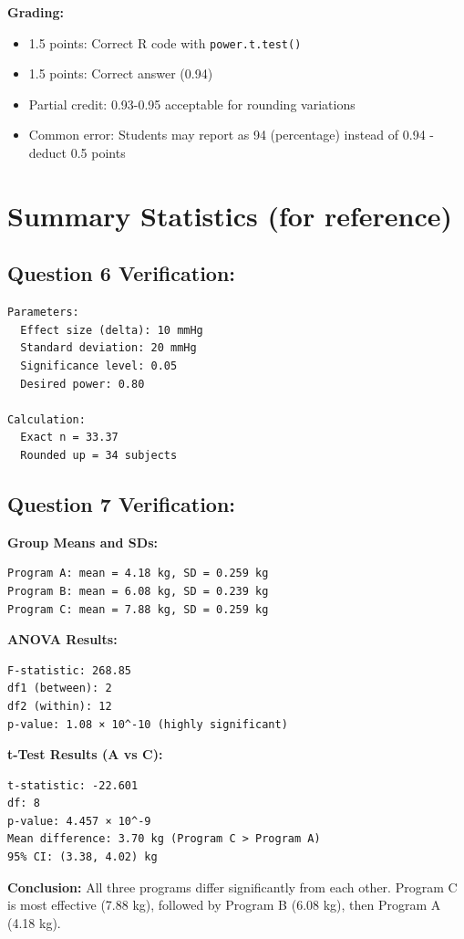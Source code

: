 \documentclass[11pt]{article}
\begin{document}
\textbf{Grading:}
\begin{itemize}
\item 1.5 points: Correct R code with \texttt{power.t.test()}
\item 1.5 points: Correct answer (0.94)
\item Partial credit: 0.93-0.95 acceptable for rounding variations
\item Common error: Students may report as 94 (percentage) instead of 0.94 - deduct 0.5 points
\end{itemize}

\newpage

\section*{Summary Statistics (for reference)}

\subsection*{Question 6 Verification:}
\begin{verbatim}
Parameters:
  Effect size (delta): 10 mmHg
  Standard deviation: 20 mmHg
  Significance level: 0.05
  Desired power: 0.80

Calculation:
  Exact n = 33.37
  Rounded up = 34 subjects
\end{verbatim}

\subsection*{Question 7 Verification:}
\textbf{Group Means and SDs:}
\begin{verbatim}
Program A: mean = 4.18 kg, SD = 0.259 kg
Program B: mean = 6.08 kg, SD = 0.239 kg
Program C: mean = 7.88 kg, SD = 0.259 kg
\end{verbatim}

\textbf{ANOVA Results:}
\begin{verbatim}
F-statistic: 268.85
df1 (between): 2
df2 (within): 12
p-value: 1.08 × 10^-10 (highly significant)
\end{verbatim}

\textbf{t-Test Results (A vs C):}
\begin{verbatim}
t-statistic: -22.601
df: 8
p-value: 4.457 × 10^-9
Mean difference: 3.70 kg (Program C > Program A)
95% CI: (3.38, 4.02) kg
\end{verbatim}

\textbf{Conclusion:} All three programs differ significantly from each other. Program C is most effective (7.88 kg), followed by Program B (6.08 kg), then Program A (4.18 kg).
\end{document}
